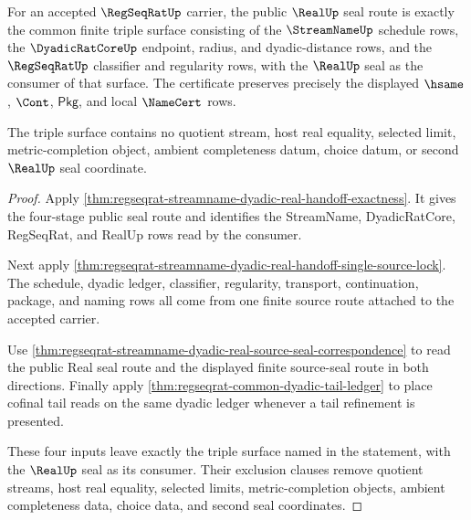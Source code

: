 \begin{theorem}
\label{thm:regseqrat-streamname-dyadic-real-triple-exactness}
For an accepted $\RegSeqRatUp$ carrier, the public $\RealUp$ seal route is
exactly the common finite triple surface consisting of the $\StreamNameUp$
schedule rows, the $\DyadicRatCoreUp$ endpoint, radius, and dyadic-distance
rows, and the $\RegSeqRatUp$ classifier and regularity rows, with the $\RealUp$
seal as the consumer of that surface. The certificate preserves precisely the
displayed $\hsame$, $\Cont$, $\mathsf{Pkg}$, and local $\NameCert$ rows.

The triple surface contains no quotient stream, host real equality, selected
limit, metric-completion object, ambient completeness datum, choice datum, or
second $\RealUp$ seal coordinate.
\end{theorem}
\begin{proof}
Apply \autoref{thm:regseqrat-streamname-dyadic-real-handoff-exactness}. It gives
the four-stage public seal route and identifies the StreamName, DyadicRatCore,
RegSeqRat, and RealUp rows read by the consumer.

Next apply
\autoref{thm:regseqrat-streamname-dyadic-real-handoff-single-source-lock}. The
schedule, dyadic ledger, classifier, regularity, transport, continuation,
package, and naming rows all come from one finite source route attached to the
accepted carrier.

Use \autoref{thm:regseqrat-streamname-dyadic-real-source-seal-correspondence} to
read the public Real seal route and the displayed finite source-seal route in
both directions. Finally apply \autoref{thm:regseqrat-common-dyadic-tail-ledger}
to place cofinal tail reads on the same dyadic ledger whenever a tail
refinement is presented.

These four inputs leave exactly the triple surface named in the statement, with
the $\RealUp$ seal as its consumer. Their exclusion clauses remove quotient
streams, host real equality, selected limits, metric-completion objects,
ambient completeness data, choice data, and second seal coordinates.
\end{proof}

